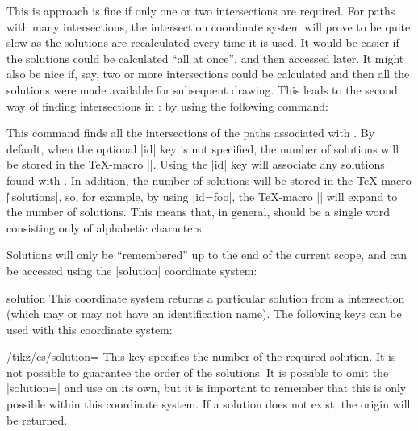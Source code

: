   This is approach is fine if only one or two intersections are 
  required. For paths with many intersections, the intersection
  coordinate system will prove to be quite slow as the solutions 
  are recalculated every time it is used. It would be
  easier if the solutions could be calculated ``all at once'', and
  then accessed later. It might also be nice if, say, two or
  more intersections could be calculated and then all the solutions
  were made available for subsequent drawing. This leads to the
  second way of finding intersections in \tikzname: by using the
  following command:

\begin{command}{\tikzintersectnamedpaths\opt{|[id=|\meta{name}|]|}}
  
  This command finds all the intersections of the paths associated 
  with  . 
  By default, when the optional |id| key is not 
  specified, the number of solutions will be stored in the \TeX-macro 
  |\solutions|. Using the |id| key will associate any solutions
  found with . In addition, the number of solutions will 
  be stored in the \TeX-macro |\||solutions|, so, for 
  example, by using |id=foo|, the \TeX-macro |\foosolutions|  will 
  expand to the number of solutions. This means that, in general, 
   should be a single word consisting only of alphabetic 
  characters.
  
  Solutions will only be ``remembered'' up to the end of the current
  scope, and can be accessed using the |solution| coordinate system:
    
\begin{coordinatesystem}{solution}
  This coordinate system returns a particular solution from 
  a intersection (which may or may not have an identification 
  name). The following keys can be used with this coordinate
  system:

\begin{key}{/tikz/cs/solution=}
  This key specifies the number of the required solution. It is not
  possible to guarantee the order of the solutions. It is possible
  to omit the |solution=| and use  on its own, but it
  is important to remember that this is only possible within this
  coordinate system. If a solution does not exist, the origin will be
  returned.

\begin{codeexample}[]
\end{codeexample}
\end{key}


\end{coordinatesystem}
\end{command}
